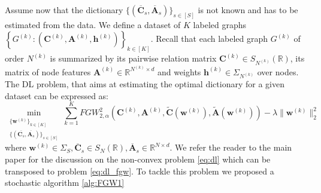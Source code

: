 \documentclass{article}
\def\vh{{\bm{h}}}
\def\vw{{\bm{w}}}
\def\mA{{\bm{A}}}
\def\mC{{\bm{C}}}
\newcommand{\R}{\mathbb{R}}
\def\R{{\mathbb{R}}}
\begin{document}
	Assume now that the dictionary $\{(\overline{\mC}_s,\overline{\mA}_s)\}_{s \in [S]}$ is not known
	and has to be estimated from the data.
	We define a dataset of $K$ labeled graphs $\left\{ G^{(k)} :
	(\mC^{(k)},\mA^{(k)},\vh^{(k)}) \right\}_{k \in [K]}$. Recall that each labeled graph $G^{(k)}$ of
	order $N^{(k)}$ is summarized by its pairwise relation matrix $\mC^{(k)} \in
	S_{N^{(k)}}(\R)$, its matrix of node features $\mA^{(k)} \in \R^{N^{(k)}\times d}$ and weights $\vh^{(k)} \in \Sigma_{N^{(k)}}$ over nodes.
	The DL problem, that aims at estimating the optimal dictionary
	for a given dataset can be expressed as:
	\begin{equation}
	\min_{\begin{smallmatrix}\{\vw^{(k)}\}_{k\in [K]} \\
		\{(\overline{\mC_s},\overline{\mA_s})\}_{s \in [S]} \end{smallmatrix}} \sum_{k=1}^K FGW^2_{2,\alpha}\left(\mC^{(k)},\mA^{(k)},\widetilde{\mC}(\vw^{(k)}),\widetilde{\mA}(\vw^{(k)})\right)- \lambda \|\vw^{(k)}\|^2_2 \label{eq:dl_fgw}
	\end{equation}
	where $\vw^{(k)} \in \Sigma_S, \overline{\mC}_s \in S_N(\R), \overline{\mA}_s \in \R^{N \times d}$. We refer the reader to the main paper for the discussion on the non-convex problem \ref{eq:dl} which can be transposed to problem \ref{eq:dl_fgw}. To tackle this problem we proposed a stochastic algorithm \ref{alg:FGW1}
	
\end{document}
